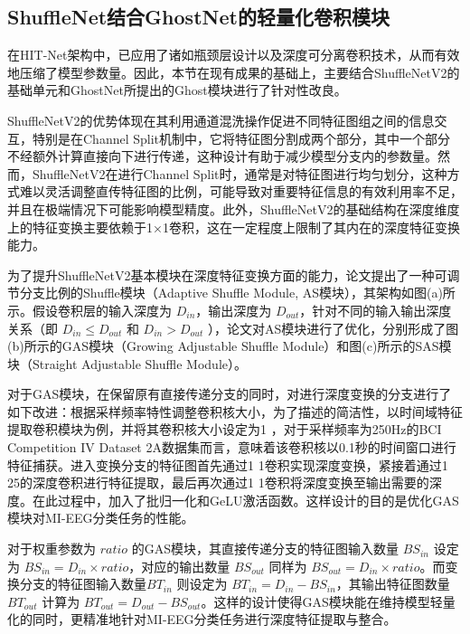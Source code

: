 \subsection{ShuffleNet结合GhostNet的轻量化卷积模块}

在HIT-Net架构中，已应用了诸如瓶颈层设计以及深度可分离卷积技术，从而有效地压缩了模型参数量。因此，本节在现有成果的基础上，主要结合ShuffleNetV2的基础单元和GhostNet所提出的Ghost模块进行了针对性改良。

ShuffleNetV2的优势体现在其利用通道混洗操作促进不同特征图组之间的信息交互，特别是在Channel Split机制中，它将特征图分割成两个部分，其中一个部分不经额外计算直接向下进行传递，这种设计有助于减少模型分支内的参数量。然而，ShuffleNetV2在进行Channel Split时，通常是对特征图进行均匀划分，这种方式难以灵活调整直传特征图的比例，可能导致对重要特征信息的有效利用率不足，并且在极端情况下可能影响模型精度。此外，ShuffleNetV2的基础结构在深度维度上的特征变换主要依赖于1×1卷积，这在一定程度上限制了其内在的深度特征变换能力。

为了提升ShuffleNetV2基本模块在深度特征变换方面的能力，论文提出了一种可调节分支比例的Shuffle模块（Adaptive Shuffle Module, AS模块），其架构如图(a)所示。假设卷积层的输入深度为 \(D_{in}\)，输出深度为 \(D_{out}\)，针对不同的输入输出深度关系（即 \(D_{in} \le D_{out}\) 和 \(D_{in} > D_{out}\) ），论文对AS模块进行了优化，分别形成了图(b)所示的GAS模块（Growing Adjustable Shuffle Module）和图(c)所示的SAS模块（Straight Adjustable Shuffle Module）。

对于GAS模块，在保留原有直接传递分支的同时，对进行深度变换的分支进行了如下改进：根据采样频率特性调整卷积核大小，为了描述的简洁性，以时间域特征提取卷积模块为例，并将其卷积核大小设定为1 ，对于采样频率为250Hz的BCI Competition IV Dataset 2A数据集而言，意味着该卷积核以0.1秒的时间窗口进行特征捕获。进入变换分支的特征图首先通过1 \times 1卷积实现深度变换，紧接着通过1 \times 25的深度卷积进行特征提取，最后再次通过1 \times 1卷积将深度变换至输出需要的深度。在此过程中，加入了批归一化和GeLU激活函数。这样设计的目的是优化GAS模块对MI-EEG分类任务的性能。

对于权重参数为 \(ratio\) 的GAS模块，其直接传递分支的特征图输入数量 \(BS_{in}\) 设定为 \(BS_{in} = D_{in} \times ratio\)，对应的输出数量 \(BS_{out}\) 同样为 \(BS_{out} = D_{in} \times ratio\)。而变换分支的特征图输入数量\(BT_{in}\) 则设定为 \(BT_{in} = D_{in} - BS_{in}\)，其输出特征图数量 \(BT_{out}\) 计算为 \(BT_{out} = D_{out} - BS_{out}\)。这样的设计使得GAS模块能在维持模型轻量化的同时，更精准地针对MI-EEG分类任务进行深度特征提取与整合。

